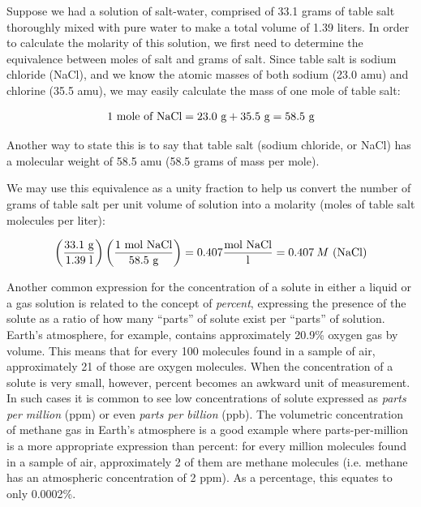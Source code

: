 Suppose we had a solution of salt-water, comprised of 33.1 grams of table salt thoroughly mixed with pure water to make a total volume of 1.39 liters.  In order to calculate the molarity of this solution, we first need to determine the equivalence between moles of salt and grams of salt.  Since table salt is sodium chloride (NaCl), and we know the atomic masses of both sodium (23.0 amu) and chlorine (35.5 amu), we may easily calculate the mass of one mole of table salt:

$$\hbox{1 mole of NaCl} = \hbox{23.0 g} + \hbox{35.5 g} = \hbox{58.5 g}$$

Another way to state this is to say that table salt (sodium chloride, or NaCl) has a molecular weight of 58.5 amu (58.5 grams of mass per mole).

We may use this equivalence as a unity fraction to help us convert the number of grams of table salt per unit volume of solution into a molarity (moles of table salt molecules per liter):

$$\left(\hbox{33.1 g} \over \hbox{1.39 l} \right) \left(\hbox{1 mol NaCl} \over \hbox{58.5 g} \right) = 0.407 {\hbox{mol NaCl} \over \hbox{l}} = 0.407 \> M \hbox{ (NaCl)}$$


\vskip 10pt

Another common expression for the concentration of a solute in either a liquid or a gas solution is related to the concept of \textit{percent}, expressing the presence of the solute as a ratio of how many ``parts'' of solute exist per ``parts'' of solution.  Earth's atmosphere, for example, contains approximately 20.9\% oxygen gas by volume.  This means that for every 100 molecules found in a sample of air, approximately 21 of those are oxygen molecules.  When the concentration of a solute is very small, however, percent becomes an awkward unit of measurement.  In such cases it is common to see low concentrations of solute expressed as \textit{parts per million} (ppm) or even \textit{parts per billion} (ppb).  The volumetric concentration of methane gas in Earth's atmosphere is a good example where parts-per-million is a more appropriate expression than percent: for every million molecules found in a sample of air, approximately 2 of them are methane molecules (i.e. methane has an atmospheric concentration of 2 ppm).  As a percentage, this equates to only 0.0002\%.

